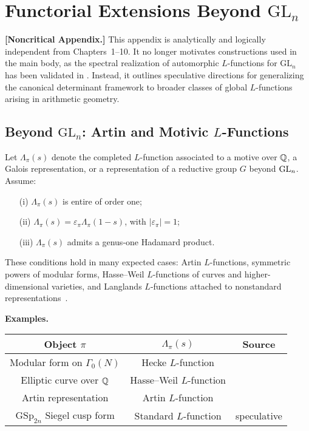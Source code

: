 \section{Functorial Extensions Beyond \texorpdfstring{$\mathrm{GL}_n$}{GLn}}
\label{app:functorial_extensions}

\noindent\textbf{[Noncritical Appendix.]}  
This appendix is analytically and logically independent from Chapters~1–10. It no longer motivates constructions used in the main body, as the spectral realization of automorphic \( L \)-functions for \( \mathrm{GL}_n \) has been validated in . Instead, it outlines speculative directions for generalizing the canonical determinant framework to broader classes of global \( L \)-functions arising in arithmetic geometry.

\subsection*{Beyond \texorpdfstring{$\mathrm{GL}_n$}{GLn}: Artin and Motivic \( L \)-Functions}

Let \( \Lambda_\pi(s) \) denote the completed \( L \)-function associated to a motive over \( \mathbb{Q} \), a Galois representation, or a representation of a reductive group \( G \) beyond \( \mathrm{GL}_n \). Assume:
\begin{itemize}
  \item[(i)] \( \Lambda_\pi(s) \) is entire of order one;
  \item[(ii)] \( \Lambda_\pi(s) = \varepsilon_\pi \Lambda_\pi(1 - s) \), with \( |\varepsilon_\pi| = 1 \);
  \item[(iii)] \( \Lambda_\pi(s) \) admits a genus-one Hadamard product.
\end{itemize}

These conditions hold in many expected cases: Artin \( L \)-functions, symmetric powers of modular forms, Hasse–Weil \( L \)-functions of curves and higher-dimensional varieties, and Langlands \( L \)-functions attached to nonstandard representations~\cite{Langlands1970EulerProducts, Deligne1971WeilI}.

\medskip
\noindent\textbf{Examples.}
\begin{center}
\renewcommand{\arraystretch}{1.3}
\begin{tabular}{|c|c|c|}
\hline
\textbf{Object \( \pi \)} & \textbf{\( \Lambda_\pi(s) \)} & \textbf{Source} \\
\hline
Modular form on \( \Gamma_0(N) \) & Hecke \( L \)-function & \cite{Cogdell2007Lectures} \\
Elliptic curve over \( \mathbb{Q} \) & Hasse–Weil \( L \)-function & \cite{Deligne1971WeilI} \\
Artin representation & Artin \( L \)-function & \cite{Langlands1970EulerProducts} \\
\( \mathrm{GSp}_{2n} \) Siegel cusp form & Standard \( L \)-function & speculative \\
\hline
\end{tabular}
\end{center}

